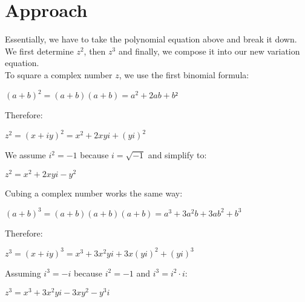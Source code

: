 \documentclass[]{article}
\begin{document}
\pagebreak

\section{Approach}

Essentially, we have to take the polynomial equation above and break it down. We first determine $z^2$, then $z^3$ and finally, we compose it into our new variation equation. \\

\noindent To square a complex number $z$, we use the first binomial formula:

\begin{flushleft}
	\hspace{20pt} $(a + b)^2 = (a + b)(a + b) = a^2 + 2ab + b²$
\end{flushleft}

\noindent Therefore:

\begin{flushleft}
	\hspace{20pt} $z^2 = (x + iy)^2 = x^2 + 2xyi + (yi)^2$
\end{flushleft}

\noindent We assume $i^2 = -1$ because $i = \sqrt{-1}$ and simplify to:

\begin{flushleft}
	\hspace{20pt} $z^2 = x^2 + 2xyi - y^2 $
\end{flushleft}

\noindent Cubing a complex number works the same way:

\begin{flushleft}
	\hspace{20pt} $(a + b)^3 = (a + b)(a + b)(a + b) = a^3 + 3a^2b + 3ab^2 + b^3$
\end{flushleft}

\noindent Therefore:

\begin{flushleft}
	\hspace{20pt} $z^3 = (x + iy)^3 = x^3 + 3x^2yi + 3x(yi)^2 + (yi)^3$
\end{flushleft}

\noindent Assuming $i^3 = -i$ because $i^2 = -1$ and $i^3 = i^2 \cdot i$:

\begin{flushleft}
	\hspace{20pt} $z^3 = x^3 + 3x^2yi - 3xy^2 - y^3i$
\end{flushleft}
\end{document}
